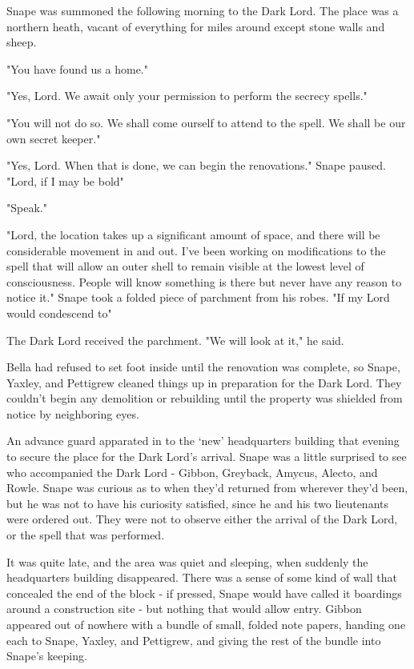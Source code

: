 Snape was summoned the following morning to the Dark Lord. The place was a northern heath, vacant of everything for miles around except stone walls and sheep.

"You have found us a home."

"Yes, Lord. We await only your permission to perform the secrecy spells."

"You will not do so. We shall come ourself to attend to the spell. We shall be our own secret keeper."

"Yes, Lord. When that is done, we can begin the renovations." Snape paused. "Lord, if I may be bold{\el}"

"Speak."

"Lord, the location takes up a significant amount of space, and there will be considerable movement in and out. I've been working on modifications to the spell that will allow an outer shell to remain visible at the lowest level of consciousness. People will know something is there but never have any reason to notice it." Snape took a folded piece of parchment from his robes. "If my Lord would condescend to{\el}"

The Dark Lord received the parchment. "We will look at it," he said.

Bella had refused to set foot inside until the renovation was complete, so Snape, Yaxley, and Pettigrew cleaned things up in preparation for the Dark Lord. They couldn't begin any demolition or rebuilding until the property was shielded from notice by neighboring eyes.

An advance guard apparated in to the `new' headquarters building that evening to secure the place for the Dark Lord's arrival. Snape was a little surprised to see who accompanied the Dark Lord - Gibbon, Greyback, Amycus, Alecto, and Rowle. Snape was curious as to when they'd returned from wherever they'd been, but he was not to have his curiosity satisfied, since he and his two lieutenants were ordered out. They were not to observe either the arrival of the Dark Lord, or the spell that was performed.

It was quite late, and the area was quiet and sleeping, when suddenly the headquarters building disappeared. There was a sense of some kind of wall that concealed the end of the block - if pressed, Snape would have called it boardings around a construction site - but nothing that would allow entry. Gibbon appeared out of nowhere with a bundle of small, folded note papers, handing one each to Snape, Yaxley, and Pettigrew, and giving the rest of the bundle into Snape's keeping.

